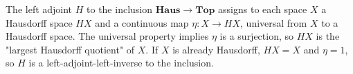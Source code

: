 The left adjoint $H$ to the inclusion $\mathbf{Haus} \to \mathbf{Top}$ assigns to each space $X$ a Hausdorff space $HX$ and a continuous map $\eta: X \to HX$, universal from $X$ to a Hausdorff space. The universal property implies $\eta$ is a surjection, so $HX$ is the "largest Hausdorff quotient" of $X$. If $X$ is already Hausdorff, $HX = X$ and $\eta = 1$, so $H$ is a left-adjoint-left-inverse to the inclusion.
